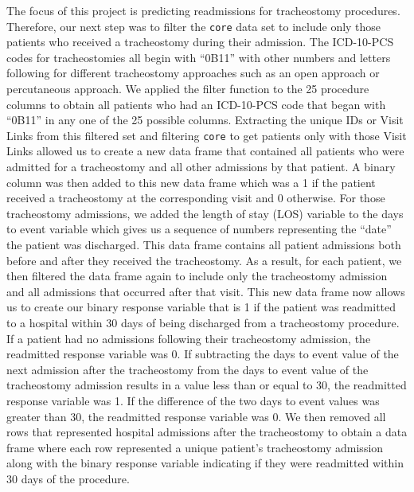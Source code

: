 \documentclass[sn-basic,pdflatex]{sn-jnl}
\theoremstyle{remark}
\theoremstyle{definition}
\begin{document}
The focus of this project is predicting readmissions for tracheostomy
procedures. Therefore, our next step was to filter the \texttt{core}
data set to include only those patients who received a tracheostomy
during their admission. The ICD-10-PCS codes for tracheostomies all
begin with ``0B11'' with other numbers and letters following for
different tracheostomy approaches such as an open approach or
percutaneous approach. We applied the filter function to the 25
procedure columns to obtain all patients who had an ICD-10-PCS code that
began with ``0B11'' in any one of the 25 possible columns. Extracting
the unique IDs or Visit Links from this filtered set and filtering
\texttt{core} to get patients only with those Visit Links allowed us to
create a new data frame that contained all patients who were admitted
for a tracheostomy and all other admissions by that patient. A binary
column was then added to this new data frame which was a 1 if the
patient received a tracheostomy at the corresponding visit and 0
otherwise. For those tracheostomy admissions, we added the length of
stay (LOS) variable to the days to event variable which gives us a
sequence of numbers representing the ``date'' the patient was
discharged. This data frame contains all patient admissions both before
and after they received the tracheostomy. As a result, for each patient,
we then filtered the data frame again to include only the tracheostomy
admission and all admissions that occurred after that visit. \newline
\newline This new data frame now allows us to create our binary response
variable that is 1 if the patient was readmitted to a hospital within 30
days of being discharged from a tracheostomy procedure. If a patient had
no admissions following their tracheostomy admission, the readmitted
response variable was 0. If subtracting the days to event value of the
next admission after the tracheostomy from the days to event value of
the tracheostomy admission results in a value less than or equal to 30,
the readmitted response variable was 1. If the difference of the two
days to event values was greater than 30, the readmitted response
variable was 0. \newline \newline We then removed all rows that
represented hospital admissions after the tracheostomy to obtain a data
frame where each row represented a unique patient's tracheostomy
admission along with the binary response variable indicating if they
were readmitted within 30 days of the procedure.
\end{document}

